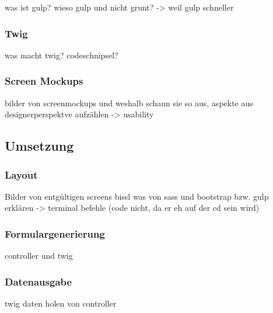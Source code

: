 was ist gulp? wieso gulp und nicht grunt? -> weil gulp schneller

    \subsubsection{Twig}

was macht twig? codeschnipsel?

    \subsubsection{Screen Mockups}

bilder von screenmockups und weshalb schaun sie so aus, aspekte aus designerperspektve aufzählen -> usability

  \subsection{Umsetzung}

    \subsubsection{Layout}

Bilder von entgültigen screens
bissl was von sass und bootstrap bzw. gulp erklären -> terminal befehle (code nicht, da er eh auf der cd sein wird)

    \subsubsection{Formulargenerierung}

controller und twig

    \subsubsection{Datenausgabe}

twig daten holen von controller 
